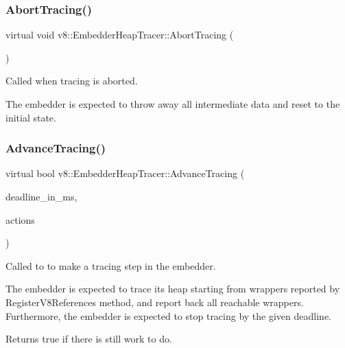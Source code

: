 \subsubsection{\texorpdfstring{Abort\+Tracing()}{AbortTracing()}}
{\footnotesize\ttfamily virtual void v8\+::\+Embedder\+Heap\+Tracer\+::\+Abort\+Tracing (\begin{DoxyParamCaption}{ }\end{DoxyParamCaption})\hspace{0.3cm}{\ttfamily [pure virtual]}}

Called when tracing is aborted.

The embedder is expected to throw away all intermediate data and reset to the initial state. \mbox{\label{classv8_1_1EmbedderHeapTracer_a33e9ab6a32d22aa104ccdfac9a023ddb}} 
\subsubsection{\texorpdfstring{Advance\+Tracing()}{AdvanceTracing()}}
{\footnotesize\ttfamily virtual bool v8\+::\+Embedder\+Heap\+Tracer\+::\+Advance\+Tracing (\begin{DoxyParamCaption}\item[{double}]{deadline\+\_\+in\+\_\+ms,  }\item[{\mbox{\hyperlink{structv8_1_1EmbedderHeapTracer_1_1AdvanceTracingActions}{Advance\+Tracing\+Actions}}}]{actions }\end{DoxyParamCaption})\hspace{0.3cm}{\ttfamily [pure virtual]}}

Called to to make a tracing step in the embedder.

The embedder is expected to trace its heap starting from wrappers reported by Register\+V8\+References method, and report back all reachable wrappers. Furthermore, the embedder is expected to stop tracing by the given deadline.

Returns true if there is still work to do. \mbox{\label{classv8_1_1EmbedderHeapTracer_a802d0e71f8b360c1391d166f32caf098}} 
